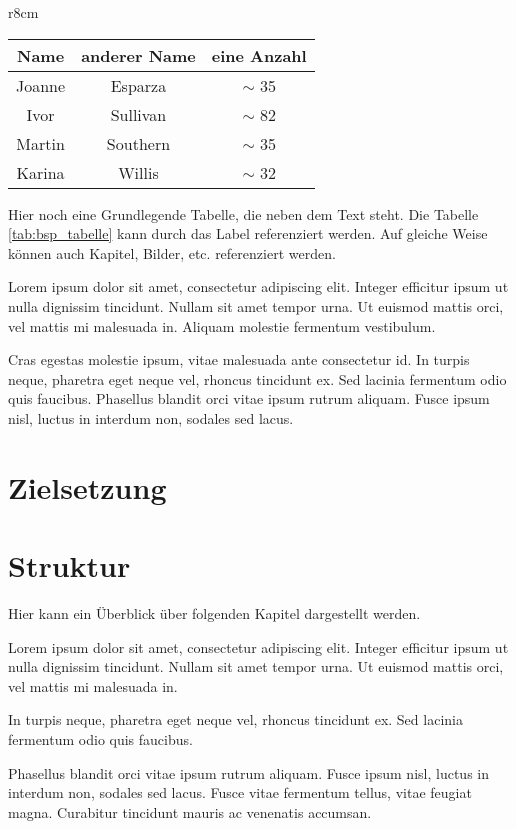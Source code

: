 \begin{wraptable}[9]{r}{8cm} 
\begin{center}
\begin{tabular}{||c c c||} 
    \hline
    Name & anderer Name & eine Anzahl \\ [0.5ex] 
    \hline\hline
    Joanne &
    Esparza &
    $\sim$ 35 \\
    \hline
    Ivor &
    Sullivan &
    $\sim$ 82 \\ 
    \hline
    Martin & 
    Southern &
    $\sim$ 35 \\
    \hline
    Karina & 
    Willis &
    $\sim$ 32 \\
    \hline
\end{tabular}
\end{center}
\caption{Anzahl Einträge in den Tabellen}
\label{tab:bsp_tabelle}
\end{wraptable} 

Hier noch eine Grundlegende Tabelle, die neben dem Text steht.
Die Tabelle \ref{tab:bsp_tabelle} kann durch das Label referenziert werden.
Auf gleiche Weise können auch Kapitel, Bilder, etc. referenziert werden.

Lorem ipsum dolor sit amet, consectetur adipiscing elit. Integer efficitur ipsum ut nulla dignissim tincidunt. Nullam sit amet tempor urna. Ut euismod mattis orci, vel mattis mi malesuada in. Aliquam molestie fermentum vestibulum. 

Cras egestas molestie ipsum, vitae malesuada ante consectetur id. In turpis neque, pharetra eget neque vel, rhoncus tincidunt ex. Sed lacinia fermentum odio quis faucibus. Phasellus blandit orci vitae ipsum rutrum aliquam. Fusce ipsum nisl, luctus in interdum non, sodales sed lacus. 


\clearpage

\section{Zielsetzung}


\section{Struktur}
\label{kap:ueberblick}

Hier kann ein Überblick über folgenden Kapitel dargestellt werden.

Lorem ipsum dolor sit amet, consectetur adipiscing elit. Integer efficitur ipsum ut nulla dignissim tincidunt. Nullam sit amet tempor urna. Ut euismod mattis orci, vel mattis mi malesuada in.

In turpis neque, pharetra eget neque vel, rhoncus tincidunt ex. Sed lacinia fermentum odio quis faucibus. 

Phasellus blandit orci vitae ipsum rutrum aliquam. Fusce ipsum nisl, luctus in interdum non, sodales sed lacus. Fusce vitae fermentum tellus, vitae feugiat magna. Curabitur tincidunt mauris ac venenatis accumsan. 